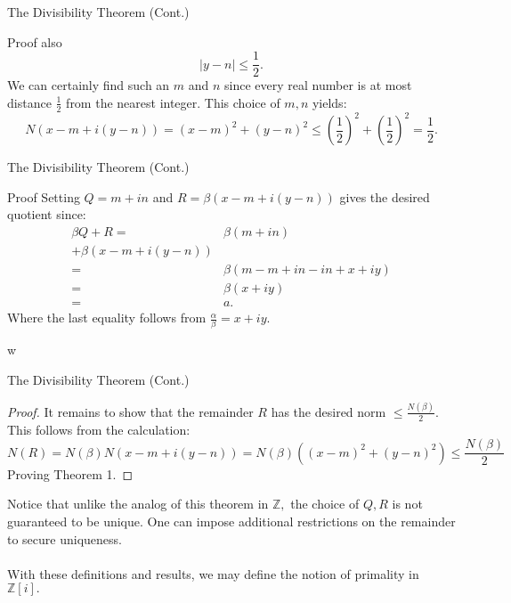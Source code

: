 \begin{frame}{The Divisibility Theorem (Cont.)}
    \begin{block}{Proof}
    also
$$\mid y-n\mid \leq \frac{1}{2}.$$
        We can certainly find such an $m$ and $n$ since every real number is at most distance $\frac{1}{2}$ from the nearest integer. This choice of $m,n$ yields:
$$N(x-m+i(y-n))=(x-m)^2+(y-n)^2\leq (\frac{1}{2})^2+(\frac{1}{2})^2=\frac{1}{2}.$$
    \end{block}
\end{frame}




\begin{frame}{The Divisibility Theorem (Cont.)}
    \begin{block}{Proof}
        Setting $Q=m+in$ and $R=\beta(x-m+i(y-n))$ gives the desired quotient since:
            \begin{align*}
                \beta Q+R =& \beta(m+in)\\ +\beta(x-m+i(y-n))\\
                =& \beta(m-m+in-in+x+iy)\\ =& \beta(x+iy)\\
                =& a.
            \end{align*}
    Where the last equality follows from $\frac{\alpha}{\beta}=x+iy$. \\
    \end{block}
w\end{frame}




\begin{frame}{The Divisibility Theorem (Cont.)}
    \begin{proof}
It remains to show that the remainder $R$ has the desired norm $\leq \frac{N(\beta)}{2}.$\\
This follows from the calculation:
$$N(R)=N(\beta)N(x-m+i(y-n))=N(\beta)((x-m)^2+(y-n)^2)\leq \frac{N(\beta)}{2}$$
Proving Theorem 1.
    \end{proof}
    
Notice that unlike the analog of this theorem in $\mathbb{Z},$ the choice of $Q,R$ is not guaranteed to be unique. One can impose additional restrictions on the remainder to secure uniqueness. \\\\
With these definitions and results, we may define the notion of primality in $\mathbb{Z}[i].$ \\
\end{frame}



